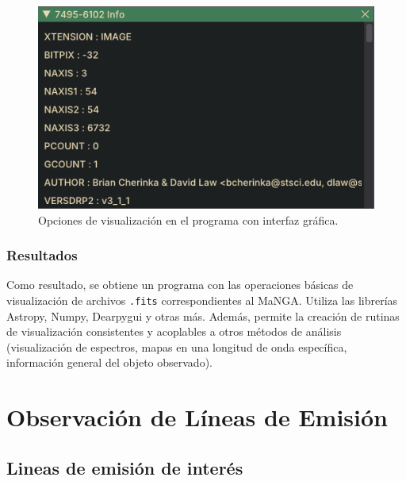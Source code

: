 \documentclass[10pt,twocolumn,a4paper]{opticajnl}
\begin{document}
\begin{figure}
\includegraphics[width=0.8\linewidth]{moreinfo.png}
\caption{Opciones de visualización en el programa con interfaz gráfica.}
\label{fig
}
\end{figure}

\subsubsection*{Resultados}
Como resultado, se obtiene un programa con las operaciones básicas de visualización de archivos \verb|.fits| correspondientes al MaNGA. Utiliza las librerías Astropy, Numpy, Dearpygui y otras más. Además, permite la creación de rutinas de visualización consistentes y acoplables a otros métodos de análisis (visualización de espectros, mapas en una longitud de onda específica, información general del objeto observado).

\section*{Observación de Líneas de Emisión}

\subsection*{Lineas de emisión de interés}
\end{document}
